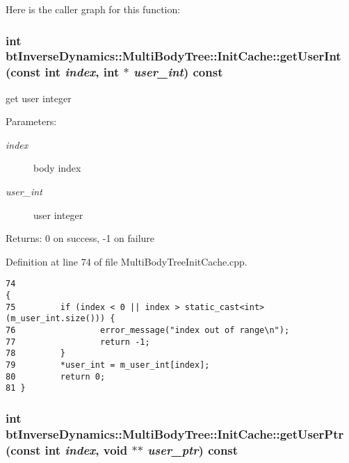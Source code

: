 Here is the caller graph for this function:\hypertarget{classbt_inverse_dynamics_1_1_multi_body_tree_1_1_init_cache_88ec979065d527a5ee6759e8dfb8a768}{
\subsubsection[getUserInt]{\setlength{\rightskip}{0pt plus 5cm}int btInverseDynamics::MultiBodyTree::InitCache::getUserInt (const int {\em index}, \/  int $\ast$ {\em user\_\-int}) const}}
\label{classbt_inverse_dynamics_1_1_multi_body_tree_1_1_init_cache_88ec979065d527a5ee6759e8dfb8a768}


get user integer \begin{Desc}
\item[Parameters:]
\begin{description}
\item[{\em index}]body index \item[{\em user\_\-int}]user integer \end{description}
\end{Desc}
\begin{Desc}
\item[Returns:]0 on success, -1 on failure \end{Desc}


Definition at line 74 of file MultiBodyTreeInitCache.cpp.

\begin{Code}\begin{verbatim}74                                                                            {
75         if (index < 0 || index > static_cast<int>(m_user_int.size())) {
76                 error_message("index out of range\n");
77                 return -1;
78         }
79         *user_int = m_user_int[index];
80         return 0;
81 }
\end{verbatim}
\end{Code}


\hypertarget{classbt_inverse_dynamics_1_1_multi_body_tree_1_1_init_cache_d5bbbbb03bdeeca34fe740f45c86274b}{
\subsubsection[getUserPtr]{\setlength{\rightskip}{0pt plus 5cm}int btInverseDynamics::MultiBodyTree::InitCache::getUserPtr (const int {\em index}, \/  void $\ast$$\ast$ {\em user\_\-ptr}) const}}
\label{classbt_inverse_dynamics_1_1_multi_body_tree_1_1_init_cache_d5bbbbb03bdeeca34fe740f45c86274b}


